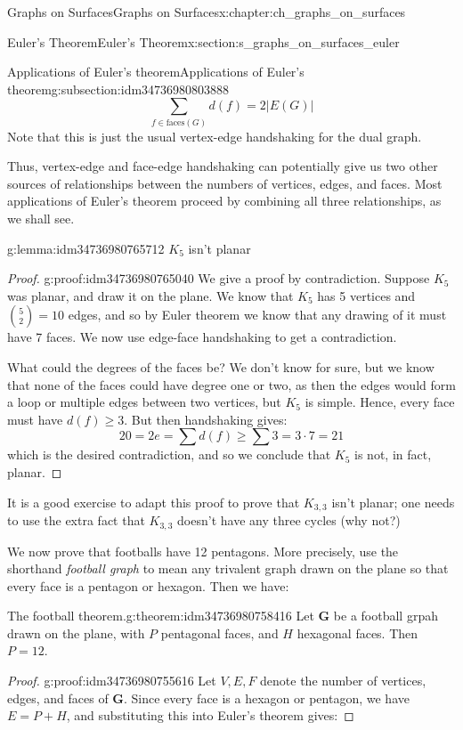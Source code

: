 \documentclass[oneside,10pt,]{book}
\numberwithin{equation}{section}
\newcommand{\bfG}{\mathbf{G}}
\begin{document}
\begin{chapterptx}{Graphs on Surfaces}{}{Graphs on Surfaces}{}{}{x:chapter:ch_graphs_on_surfaces}
\begin{sectionptx}{Euler's Theorem}{}{Euler's Theorem}{}{}{x:section:s_graphs_on_surfaces_euler}
\begin{subsectionptx}{Applications of Euler's theorem}{}{Applications of Euler's theorem}{}{}{g:subsection:idm34736980803888}
\begin{equation*}
\sum_{f\in \text{faces}(G)}d(f)=2 |E(G)|
\end{equation*}
Note that this is just the usual vertex-edge handshaking for the dual graph.%
\par
Thus, vertex-edge and face-edge handshaking can potentially give us two other sources of relationships between the numbers of vertices, edges, and faces.  Most applications of Euler's theorem proceed by combining all three relationships, as we shall see.%
\begin{lemma}{}{}{g:lemma:idm34736980765712}%
\(K_5\) isn't planar\end{lemma}
\begin{proof}{}{g:proof:idm34736980765040}
We give a proof by contradiction.  Suppose \(K_5\) was planar, and draw it on the plane.  We know that \(K_5\) has 5 vertices and \(\binom{5}{2}=10\) edges, and so by Euler theorem we know that any drawing of it must have 7 faces. We now use edge-face handshaking to get a contradiction.%
\par
What could the degrees of the faces be?  We don't know for sure, but we know that none of the faces could have degree one or two, as then the edges would form a loop or multiple edges between two vertices, but \(K_5\) is simple.  Hence, every face must have \(d(f)\geq 3\).  But then handshaking gives:%
%
\begin{equation*}
20=2e=\sum d(f)\geq \sum 3=3\cdot 7=21
\end{equation*}
which is the desired contradiction, and so we conclude that \(K_5\) is not, in fact, planar.%
\end{proof}
It is a good exercise to adapt this proof to prove that \(K_{3,3}\) isn't planar; one needs to use the extra fact that \(K_{3,3}\) doesn't have any three cycles (why not?)%
\par
We now prove that footballs have 12 pentagons.  More precisely, use the shorthand \emph{football graph} to mean any trivalent graph drawn on the plane so that every face is a pentagon or hexagon. Then we have:%
\begin{theorem}{The football theorem.}{}{g:theorem:idm34736980758416}%
Let \(\bfG\) be a football grpah drawn on the plane, with \(P\) pentagonal faces, and \(H\) hexagonal faces.  Then \(P=12\).%
\end{theorem}
\begin{proof}{}{g:proof:idm34736980755616}
Let \(V, E, F\) denote the number of vertices, edges, and faces of \(\bfG\).  Since every face is a hexagon or pentagon, we have \(E=P+H\), and substituting this into Euler's theorem gives:%

\end{proof}
\end{subsectionptx}
\end{sectionptx}
\end{chapterptx}
\end{document}
